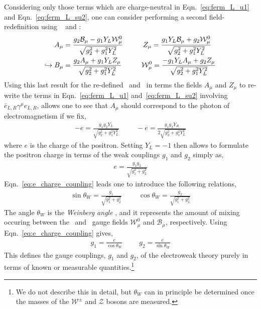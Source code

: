 Considering only those terms which are charge-neutral in Eqn.~\ref{eq:ferm_L_u1} and Eqn.~\ref{eq:ferm_L_su2}, one can consider performing a second field-redefinition using
\fieldB~ and \fieldWzero:
\begin{align}
	A_{\mu} &= \frac{g_2 \mathcal{B}_{\mu} - g_1 Y_L \mathcal{W}_{\mu}^0}{\sqrt{g_2^2 + g_1^2 Y_L^2}} \hspace{1cm} Z_{\mu} = \frac{g_1 Y_L \mathcal{B}_{\mu} + g_2 \mathcal{W}_{\mu}^0}{\sqrt{g_2^2 + g_1^2 Y_L^2}} \notag \\
	\hookrightarrow B_{\mu} &= \frac{g_2 A_{\mu} + g_1 Y_L Z_{\mu}}{\sqrt{g_2^2 + g_1^2 Y_L^2}} \hspace{1cm} \mathcal{W}_{\mu}^0 = \frac{-g_1 Y_L A_{\mu} + g_2 Z_{\mu}}{\sqrt{g_2^2 + g_1^2 Y_L^2}}
\end{align}
Using this last result for the re-defined \fieldB~and \fieldWzero~in terms the
fields $A_{\mu}$ and $Z_{\mu}$ to re-write the terms in Eqn.~\ref{eq:ferm_L_u1} and~\ref{eq:ferm_L_su2} involving $\bar{e}_{L,R} \gamma^{\mu} e_{L,R}$, allows
one to see that $A_{\mu}$ should correspond to the photon of electromagnetism if we fix,
\begin{align}
	-e = \frac{g_1 g_2 Y_L} {\sqrt{g_2^2 + g_1^2 Y_L^2}} \hspace{1cm} -e = \frac{g_1 g_2 Y_R}{2 \sqrt{g_2^2 + g_1^2 Y_L^2}} \nonumber
\end{align}
where $e$ is the charge of the positron. Setting $Y_L = -1$ then allows to formulate
the positron charge in terms of the weak couplings $g_1$ and $g_2$ simply as,
\begin{align}
	\label{eq:e_charge_coupling}
	e = \frac{g_1 g_2}{\sqrt{g_1^2 + g_2^2}}
\end{align}
Eqn.~\ref{eq:e_charge_coupling} leads one to introduce the following relations,
\begin{align}
	\sin \theta_W = \frac{g_1}{\sqrt{g_1^2 + g_2^2}} \hspace{1cm} \cos \theta_W = \frac{g_2}{\sqrt{g_1^2 + g_2^2}}
\end{align}
The angle $\theta_W$ is the \textit{Weinberg angle} {\color{red}{What is it's value? -- point to table}}, and it represents the amount of mixing
occuring between the \SUtwo~and \Uone~gauge fields $\mathcal{W}_{\mu}^0$ and $\mathcal{B}_{\mu}$, respectively. Using Eqn.~\ref{eq:e_charge_coupling} gives,
\begin{align}
	g_1 = \frac{e}{\cos \theta_W} \hspace{1cm} g_2 = \frac{e}{\sin \theta_W}
\end{align}
This defines the gauge couplings, $g_1$ and $g_2$, of the electroweak theory purely
in terms of known or measurable quantities.\footnote{We do not describe this in detail, but $\theta_W$
can in principle be determined once the masses of the $\mathcal{W^{\pm}}$ and $\mathcal{Z}$ bosons
are measured.}

